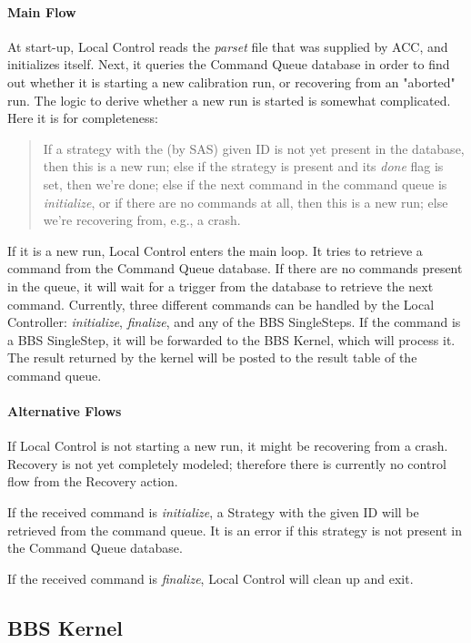 \documentclass[10pt]{lofar}
\newcommand{\bbs}{BBS\xspace}
\begin{document}
\paragraph*{Main Flow}
At start-up, Local Control reads the \emph{parset} file that was supplied by
ACC, and initializes itself. Next, it queries the Command Queue database in
order to find out whether it is starting a new calibration run, or recovering
from an "aborted" run. The logic to derive whether a new run is started is
somewhat complicated. Here it is for completeness:
\begin{quote}
If a strategy with the (by SAS) given ID is not yet present in the database,
then this is a new run; else if the strategy is present and its \textit{done}
flag is set, then we're done; else if the next command in the command queue is
\textit{initialize}, or if there are no commands at all, then this is a new
run; else we're recovering from, e.g., a crash.
\end{quote}
If it is a new run, Local Control enters the main loop. It tries to retrieve a
command from the Command Queue database. If there are no commands present in
the queue, it will wait for a trigger from the database to retrieve the next
command. Currently, three different commands can be handled by the Local
Controller: \textit{initialize}, \textit{finalize}, and any of the BBS
SingleSteps. If the command is a BBS SingleStep, it will be forwarded to the
BBS Kernel, which will process it. The result returned by the kernel will be
posted to the result table of the command queue. 

\paragraph*{Alternative Flows}
If Local Control is not starting a new run, it might be recovering from a
crash. Recovery is not yet completely modeled; therefore there is currently no
control flow from the Recovery action.

If the received command is \textit{initialize}, a Strategy with the given ID
will be retrieved from the command queue. It is an error if this strategy is
not present in the Command Queue database.

If the received command is \textit{finalize}, Local Control will clean up and
exit.

\subsection{BBS Kernel}
\label{subsec:design-kernel}
\end{document}
